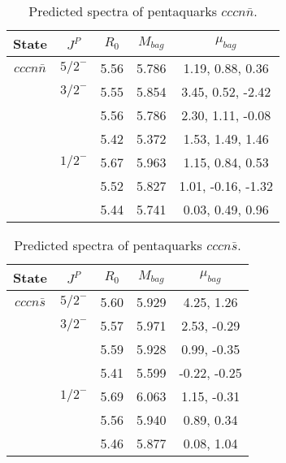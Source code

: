 \documentclass[prd,twocolumn,floatfix,nofootinbib]{revtex4}
\begin{document}
\renewcommand{\tabcolsep}{0.5cm}
\renewcommand{\arraystretch}{1.2}
\begin{table*}[!htbp]
    \caption{Predicted spectra of pentaquarks $cccn\bar{n}$.}
    \begin{tabular}{ccccc}
        \hline\hline
        {\rm State} &$J^{P}$ &$R_{0}$ &$M_{bag}$ &$\mu_{bag}$ \\ \hline
        ${cccn\bar{n}}$
            &${5/2}^{-}$    &5.56   &5.786  &1.19, 0.88, 0.36 \\
            &${3/2}^{-}$    &5.55   &5.854  &3.45, 0.52, -2.42 \\
            &               &5.56   &5.786  &2.30, 1.11, -0.08 \\
            &               &5.42   &5.372  &1.53, 1.49, 1.46 \\
            &${1/2}^{-}$    &5.67   &5.963  &1.15, 0.84, 0.53 \\
            &               &5.52   &5.827  &1.01, -0.16, -1.32 \\
            &               &5.44   &5.741  &0.03, 0.49, 0.96 \\
        \hline\hline
    \end{tabular}
\end{table*}

\renewcommand{\tabcolsep}{0.5cm}
\renewcommand{\arraystretch}{1.2}
\begin{table*}[!htbp]
    \caption{Predicted spectra of pentaquarks $cccn\bar{s}$.}
    \begin{tabular}{ccccc}
        \hline\hline
        {\rm State} &$J^{P}$ &$R_{0}$ &$M_{bag}$ &$\mu_{bag}$ \\ \hline
        ${cccn\bar{s}}$
            &${5/2}^{-}$    &5.60   &5.929  &4.25, 1.26 \\
            &${3/2}^{-}$    &5.57   &5.971  &2.53, -0.29 \\
            &               &5.59   &5.928  &0.99, -0.35 \\
            &               &5.41   &5.599  &-0.22, -0.25 \\
            &${1/2}^{-}$    &5.69   &6.063  &1.15, -0.31 \\
            &               &5.56   &5.940  &0.89, 0.34 \\
            &               &5.46   &5.877  &0.08, 1.04 \\
        \hline\hline
    \end{tabular}
\end{table*}
\end{document}
